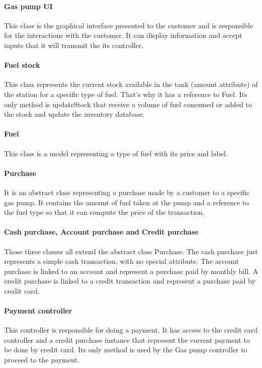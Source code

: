 \paragraph{Gas pump UI}
This class is the graphical interface presented to the customer and is responsible for the interactions with the customer. It can display information and accept inputs that it will transmit the its controller.

\paragraph{Fuel stock}
This class represents the current stock available in the tank (amount attribute) of the station for a specific type of fuel. That's why it has a reference to Fuel.
Its only method is updateStock that receive a volume of fuel consumed or added to the stock and update the inventory database.

\paragraph{Fuel}
This class is a model representing a type of fuel with its price and label.

\paragraph{Purchase}
It is an abstract class representing a purchase made by a customer to a specific gas pump. It contains the amount of fuel taken at the pump and a reference to the fuel type so that it can compute the price of the transaction.

\paragraph{Cash purchase, Account purchase and Credit purchase}
Those three classes all extend the abstract class Purchase.
The cash purchase just represents a simple cash transaction, with no special attribute.
The account purchase is linked to an account and represent a purchase paid by monthly bill. 
A credit purchase is linked to a credit transaction and represent a purchase paid by credit card.

\paragraph{Payment controller}
This controller is responsible for doing a payment. It has access to the credit card controller and a credit purchase instance that represent the current payment to be done by credit card. Its only method is used by the Gas pump controller to proceed to the payment.


